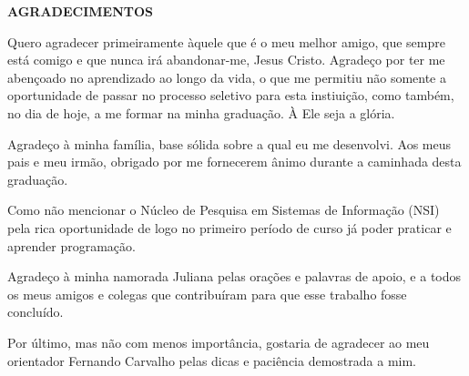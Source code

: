 \begin{center}
\textbf{AGRADECIMENTOS}
\end{center}

Quero agradecer primeiramente àquele que é o meu melhor amigo, que sempre está comigo e que nunca irá abandonar-me, Jesus Cristo. Agradeço por ter me abençoado no aprendizado ao longo da vida, o que me permitiu não somente a oportunidade de passar no processo seletivo para esta instiuição, como também, no dia de hoje, a me formar na minha graduação. À Ele seja a glória.

Agradeço à minha família, base sólida sobre a qual eu me desenvolvi. Aos meus pais e meu irmão, obrigado por me fornecerem ânimo durante a caminhada desta graduação.

Como não mencionar o Núcleo de Pesquisa em Sistemas de Informação (NSI) pela rica oportunidade de logo no primeiro período de curso já poder praticar e aprender programação.

Agradeço à minha namorada Juliana pelas orações e palavras de apoio, e a todos os meus amigos e colegas que contribuíram para que esse trabalho fosse concluído. 

Por último, mas não com menos importância, gostaria de agradecer ao meu orientador Fernando Carvalho pelas dicas e paciência demostrada a mim.
